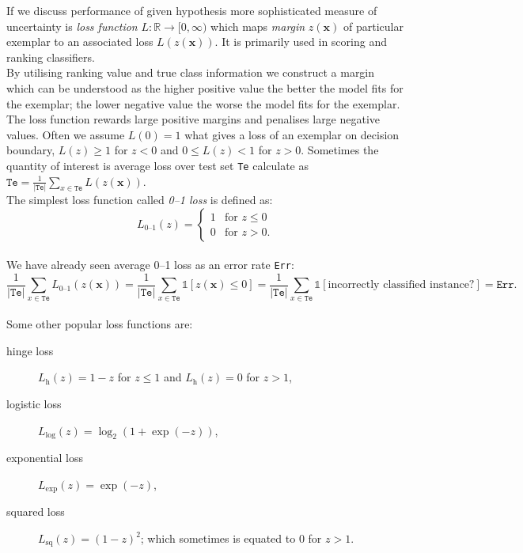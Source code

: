 \documentclass[12pt, a4paper, pdflatex, leqno]{report}
\begin{document}
If we discuss performance of given hypothesis more sophisticated measure of uncertainty is \emph{loss function} $L : \mathbb{R} \rightarrow [0, \infty)$ which maps \emph{margin} $z(\mathbf{x})$ of particular exemplar to an associated loss $L(z(\mathbf{x}))$. It is primarily used in scoring and ranking classifiers.\\
By utilising ranking value and true class information we construct a margin which can be understood as the higher positive value the better the model fits for the exemplar; the lower negative value the worse the model fits for the exemplar.\\
The loss function rewards large positive margins and penalises large negative values. Often we assume $L(0) = 1$ what gives a loss of an exemplar on decision boundary, $L(z) \geq 1$ for $z < 0$ and $0 \leq L(z) < 1$ for $z > 0$. Sometimes the quantity of interest is average loss over test set \texttt{Te} calculate as $\mathtt{Te} = \frac{1}{|\mathtt{Te}|} \sum_{x \in \mathtt{Te}} L(z(\mathbf{x}))$.\\
The simplest loss function called \emph{0--1 loss} is defined as:
\[
 L_{\text{0--1}} (z) =
  \begin{cases}
   1 & \text{for } z \leq 0 \\
   0 & \text{for } z > 0 \text{.}
  \end{cases}
\]~\\
We have already seen average 0--1 loss as an error rate \texttt{Err}:
\[ \frac{1}{|\mathtt{Te}|} \sum_{x \in \mathtt{Te}} L_{\text{0--1}}(z(\mathbf{x})) = 
   \frac{1}{|\mathtt{Te}|} \sum_{x \in \mathtt{Te}} \mathds{1} \left[ z(\mathbf{x}) \leq 0 \right] =
   \frac{1}{|\mathtt{Te}|} \sum_{x \in \mathtt{Te}} \mathds{1} \left[ \text{incorrectly classified instance?} \right] =
   \mathtt{Err}\text{.}
\]~\\

Some other popular loss functions are:
\begin{description}
\item[hinge loss] $L_{\text{h}} (z) = 1 - z$ for $z \leq 1$ and $L_{\text{h}} (z) = 0$ for $z > 1$,
\item[logistic loss] $L_{\text{log}} (z) = \log_2 (1 + \exp(-z))$,
\item[exponential loss] $L_{\text{exp}} (z) = \exp(-z)$,
\item[squared loss] $L_{\text{sq}} (z) = (1 - z)^2$; which sometimes is equated to $0$ for $z>1$.\\
\end{description}
\end{document}
